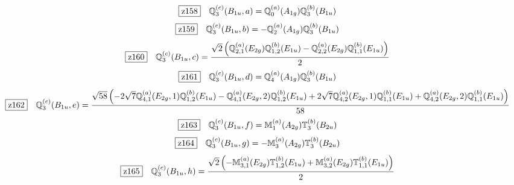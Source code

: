 \documentclass[fleqn,10pt,landscape]{jsarticle}
\begin{document}
\begin{dmath*}
\hspace*{3mm}\fbox{z158}\quad \mathbb{Q}_{3}^{(c)}(B_{1u},a)=\mathbb{Q}_{0}^{(a)}(A_{1g}) \mathbb{Q}_{3}^{(b)}(B_{1u})
\end{dmath*}
\begin{dmath*}
\hspace*{3mm}\fbox{z159}\quad \mathbb{Q}_{3}^{(c)}(B_{1u},b)=- \mathbb{Q}_{2}^{(a)}(A_{1g}) \mathbb{Q}_{3}^{(b)}(B_{1u})
\end{dmath*}
\begin{dmath*}
\hspace*{3mm}\fbox{z160}\quad \mathbb{Q}_{3}^{(c)}(B_{1u},c)=\frac{\sqrt{2} \left(\mathbb{Q}_{2,1}^{(a)}(E_{2g}) \mathbb{Q}_{1,2}^{(b)}(E_{1u}) - \mathbb{Q}_{2,2}^{(a)}(E_{2g}) \mathbb{Q}_{1,1}^{(b)}(E_{1u})\right)}{2}
\end{dmath*}
\begin{dmath*}
\hspace*{3mm}\fbox{z161}\quad \mathbb{Q}_{3}^{(c)}(B_{1u},d)=\mathbb{Q}_{4}^{(a)}(A_{1g}) \mathbb{Q}_{3}^{(b)}(B_{1u})
\end{dmath*}
\begin{dmath*}
\hspace*{3mm}\fbox{z162}\quad \mathbb{Q}_{3}^{(c)}(B_{1u},e)=\frac{\sqrt{58} \left(- 2 \sqrt{7} \mathbb{Q}_{4,1}^{(a)}(E_{2g},1) \mathbb{Q}_{1,2}^{(b)}(E_{1u}) - \mathbb{Q}_{4,1}^{(a)}(E_{2g},2) \mathbb{Q}_{1,2}^{(b)}(E_{1u}) + 2 \sqrt{7} \mathbb{Q}_{4,2}^{(a)}(E_{2g},1) \mathbb{Q}_{1,1}^{(b)}(E_{1u}) + \mathbb{Q}_{4,2}^{(a)}(E_{2g},2) \mathbb{Q}_{1,1}^{(b)}(E_{1u})\right)}{58}
\end{dmath*}
\begin{dmath*}
\hspace*{3mm}\fbox{z163}\quad \mathbb{Q}_{3}^{(c)}(B_{1u},f)=\mathbb{M}_{1}^{(a)}(A_{2g}) \mathbb{T}_{3}^{(b)}(B_{2u})
\end{dmath*}
\begin{dmath*}
\hspace*{3mm}\fbox{z164}\quad \mathbb{Q}_{3}^{(c)}(B_{1u},g)=- \mathbb{M}_{3}^{(a)}(A_{2g}) \mathbb{T}_{3}^{(b)}(B_{2u})
\end{dmath*}
\begin{dmath*}
\hspace*{3mm}\fbox{z165}\quad \mathbb{Q}_{3}^{(c)}(B_{1u},h)=\frac{\sqrt{2} \left(- \mathbb{M}_{3,1}^{(a)}(E_{2g}) \mathbb{T}_{1,2}^{(b)}(E_{1u}) + \mathbb{M}_{3,2}^{(a)}(E_{2g}) \mathbb{T}_{1,1}^{(b)}(E_{1u})\right)}{2}
\end{dmath*}
\end{document}
